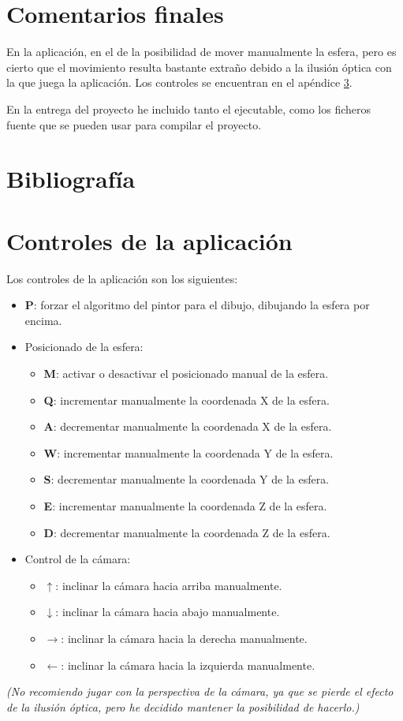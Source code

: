 \documentclass[a4paper,12pt]{article}
\begin{document}
\section{Comentarios finales}

En la aplicación, en el de la posibilidad de mover manualmente la esfera, pero es cierto que el movimiento resulta bastante extraño debido a la ilusión óptica con la que juega la aplicación. Los controles se encuentran en el apéndice \ref{controles}.

En la entrega del proyecto he incluido tanto el ejecutable, como los ficheros fuente que se pueden usar para compilar el proyecto.

\newpage
\section{Bibliografía}


\newpage
\appendix
\section{Controles de la aplicación} \label{controles}

Los controles de la aplicación son los siguientes:

\begin{itemize}
    \item \textbf{P}: forzar el algoritmo del pintor para el dibujo, dibujando la esfera por encima.
    \item Posicionado de la esfera:
    \begin{itemize}
        \item \textbf{M}: activar o desactivar el posicionado manual de la esfera.
        \item \textbf{Q}: incrementar manualmente la coordenada X de la esfera.
        \item \textbf{A}: decrementar manualmente la coordenada X de la esfera.
        \item \textbf{W}: incrementar manualmente la coordenada Y de la esfera.
        \item \textbf{S}: decrementar manualmente la coordenada Y de la esfera.
        \item \textbf{E}: incrementar manualmente la coordenada Z de la esfera.
        \item \textbf{D}: decrementar manualmente la coordenada Z de la esfera.
    \end{itemize}
    \item Control de la cámara:
    \begin{itemize}
        \item \textbf{$\uparrow$}: inclinar la cámara hacia arriba manualmente.
        \item \textbf{$\downarrow$}: inclinar la cámara hacia abajo manualmente.
        \item \textbf{$\rightarrow$}: inclinar la cámara hacia la derecha manualmente.
        \item \textbf{$\leftarrow$}: inclinar la cámara hacia la izquierda manualmente.
    \end{itemize}
\end{itemize}

\textit{(No recomiendo jugar con la perspectiva de la cámara, ya que se pierde el efecto de la ilusión óptica, pero he decidido mantener la posibilidad de hacerlo.)}
\end{document}
